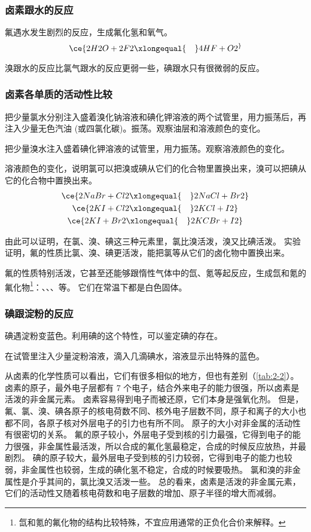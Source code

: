 \subsubsection{卤素跟水的反应}
氟遇水发生剧烈的反应，生成氟化氢和氧气。
\[ \ce{2H2O + 2F2 \xlongequal{\quad} 4HF + O2 ^}\]

溴跟水的反应比氯气跟水的反应更弱一些，碘跟水只有很微弱的反应。
\subsubsection{卤素各单质的活动性比较}
\begin{Experiment}
  把少量氯水分别注入盛着溴化钠溶液和碘化钾溶液的两个试管里，用力振荡后，再注入少量无色汽油 (或四氯化碳)。振荡。观察油层和溶液颜色的变化。
\end{Experiment}
\begin{Experiment}
  把少量溴水注入盛着碘化钾溶液的试管里，用力振荡。观察溶液颜色的变化。
\end{Experiment}

溶液颜色的变化，说明氯可以把溴或碘从它们的化合物里置换出来，溴可以把碘从它的化合物中置换出来。
\begin{gather*}
  \ce{ 2NaBr +Cl2 \xlongequal{\quad} 2NaCl +Br2 } \\ 
  \ce{ 2KI +Cl2 \xlongequal{\quad} 2KCl +I2 } \\ 
  \ce{ 2KI +Br2 \xlongequal{\quad} 2KCBr +I2 } 
\end{gather*}

由此可以证明，在氯、溴、碘这三种元素里，氯比溴活泼，溴又比碘活泼。
实验证明，氟的性质比氯、溴、碘更活泼，能把氯等从它们的卤化物中置换出来。

氟的性质特别活泼，它甚至还能够跟惰性气体中的氙、氪等起反应，生成氙和氪的氟化物\footnote{氙和氪的氟化物的结构比较特殊，不宜应用通常的正负化合价来解释。}：、、、等。
它们在常温下都是白色固体。

\subsubsection{碘跟淀粉的反应}
碘遇淀粉变蓝色。利用碘的这个特性，可以鉴定碘的存在。
\begin{Experiment}
  在试管里注入少量淀粉溶液，滴入几滴碘水，溶液显示出特殊的蓝色。
\end{Experiment}

从卤素的化学性质可以看出，它们有很多相似的地方，但也有差别（\cref{tab:2-2}）。
卤素的原子，最外电子层都有 7 个电子，结合外来电子的能力很强，所以卤素是活泼的非金属元素。
卤素容易得到电子而被还原，它们本身是强氧化剂。
但是，氟、氯、溴、碘各原子的核电荷数不同、核外电子层数不同，原子和离子的大小也都不同，各原子核对外层电子的引力也有所不同。
原子的大小对非金属的活动性有很密切的关系。
氟的原子较小，外层电子受到核的引力最强，它得到电子的能力很强，非金属性最活泼，所以合成的氟化氢最稳定，合成的时候反应放热，并最剧烈。
碘的原子较大，最外层电子受到核的引力较弱，它得到电子的能力也较弱，非金属性也较弱，生成的碘化氢不稳定，合成的时候要吸热。
氯和溴的非金属性是介乎其间的，氯比溴又活泼一些。
总的看来，卤素是活泼的非金属元素，它们的活动性又随着核电荷数和电子层数的增加、原子半径的增大而减弱。

